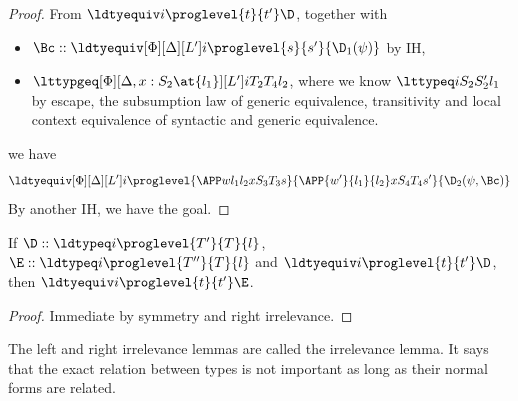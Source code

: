 \begin{proof}
  From $\ldtyequiv i \proglevel{t}{t'}\D$, together with
  \begin{itemize}
  \item $\Bc :: \ldtyequiv[\Phi][\Delta][L'] i \proglevel {s}{s'}{\D_1(\psi)}$ by IH,
  \item $\lttypgeq[\Phi][\Delta, x : S_2 \at{l_1}][L'] i{T_2}{T_4}{l_2}$, where we
    know $\lttypeq i{S_2}{S_2'}{l_1}$ by escape, the subsumption law of generic
    equivalence, transitivity and local context equivalence of syntactic and generic
    equivalence. %
  \end{itemize}
  we have
  \[
    \ldtyequiv[\Phi][\Delta][L'] i \proglevel{\APP w{l_1}{l_2} x{S_3}{T_3} s}{\APP{w'}{l_1}{l_2}
      x{S_4}{T_4}{s'}}{\D_2(\psi, \Bc)}
  \]
  By another IH, we have the goal.
\end{proof}

\begin{lemma}
  If $\D :: \ldtypeq i \proglevel{T'}{T}{l}$, $\E :: \ldtypeq i \proglevel{T''}{T}{l}$ and
  $\ldtyequiv i \proglevel{t}{t'}\D$, then $\ldtyequiv i \proglevel{t}{t'}\E$.
\end{lemma}
\begin{proof}
  Immediate by symmetry and right irrelevance. 
\end{proof}

The left and right irrelevance lemmas are called the irrelevance lemma. %
It says that the exact relation between types is not important as long as their normal
forms are related. %

